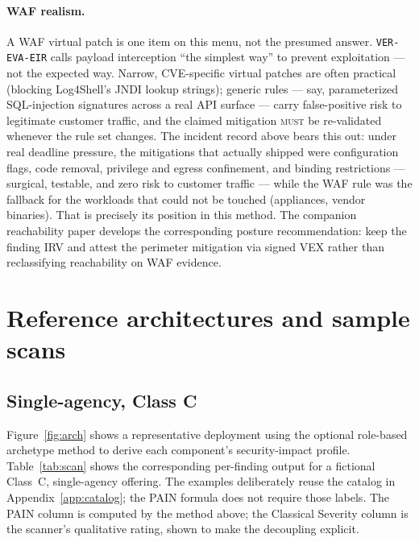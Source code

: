 \documentclass[11pt]{article}
\newcommand{\code}[1]{\texttt{#1}}
\newcommand{\rfckw}[1]{\textsc{#1}}
\begin{document}
\paragraph{WAF realism.} A WAF virtual patch is one item on this menu, not the
presumed answer. \code{VER-EVA-EIR} calls payload interception ``the simplest way''
to prevent exploitation --- not the expected way. Narrow, CVE-specific virtual
patches are often practical (blocking Log4Shell's JNDI lookup strings); generic
rules --- say, parameterized SQL-injection signatures across a real API surface ---
carry false-positive risk to legitimate customer traffic, and the claimed mitigation
\rfckw{must} be re-validated whenever the rule set changes. The incident record
above bears this out: under real deadline pressure, the mitigations that actually
shipped were configuration flags, code removal, privilege and egress confinement,
and binding restrictions --- surgical, testable, and zero risk to customer traffic
--- while the WAF rule was the fallback for the workloads that could not be touched
(appliances, vendor binaries). That is precisely its position in this method. The
companion reachability paper develops the corresponding posture recommendation:
keep the finding IRV and attest the perimeter mitigation via signed VEX rather than
reclassifying reachability on WAF evidence.

\section{Reference architectures and sample scans}
\subsection{Single-agency, Class C}
Figure~\ref{fig:arch} shows a representative deployment using the optional
role-based archetype method to derive each component's security-impact profile.
Table~\ref{tab:scan} shows the corresponding per-finding output for a fictional
Class~C, single-agency offering. The examples deliberately reuse the catalog in
Appendix~\ref{app:catalog}; the PAIN formula does not require those labels. The
PAIN column is computed by the method above; the Classical Severity column is the
scanner's qualitative rating, shown to make the decoupling explicit.
\end{document}
